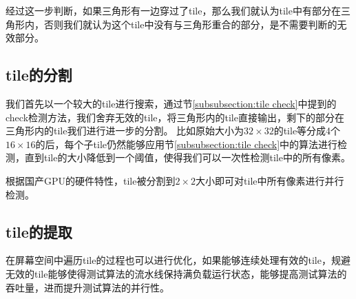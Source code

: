 经过这一步判断，如果三角形有一边穿过了tile，那么我们就认为tile中有部分在三角形内，否则我们就认为这个tile中没有与三角形重合的部分，是不需要判断的无效部分。


\subsection{tile的分割}
我们首先以一个较大的tile进行搜索，通过节\ref{subsubsection:tile check}中提到的check检测方法，我们舍弃无效的tile，将三角形内的tile直接输出，剩下的部分在三角形内的tile我们进行进一步的分割。
比如原始大小为$32\times 32$的tile等分成4个$16\times 16$的后，每个子tile仍然能够应用节\ref{subsubsection:tile check}中的算法进行检测，直到tile的大小降低到一个阈值，使得我们可以一次性检测tile中的所有像素。

根据国产GPU的硬件特性，tile被分割到$2\times 2$大小即可对tile中所有像素进行并行检测。

\subsection{tile的提取}
\label{subsection:tile seek}
在屏幕空间中遍历tile的过程也可以进行优化，如果能够连续处理有效的tile，规避无效的tile能够使得测试算法的流水线保持满负载运行状态，能够提高测试算法的吞吐量，进而提升测试算法的并行性。

